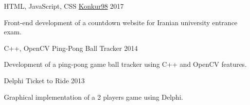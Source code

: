 \begin{cventries}
  \cventry
    {HTML, JavaScript, CSS} %
    {\href{https://konkur98.ga}{Konkur98}} %
    {} %
    {2017} %
    {
      \begin{cvitems} %
      	\item {Front-end development of a countdown website for Iranian university entrance exam.}
      \end{cvitems}
    }

  \cventry
    {C++, OpenCV} %
    {Ping-Pong Ball Tracker} %
    {} %
    {2014} %
    {
      \begin{cvitems} %
        \item {Development of a ping-pong game ball tracker using C++ and OpenCV features.}
      \end{cvitems}
    }

  \cventry
    {Delphi} %
    {Ticket to Ride} %
    {} %
    {2013} %
    {
      \begin{cvitems} %
        \item {Graphical implementation of a 2 players game using Delphi.}
      \end{cvitems}
    }

\end{cventries}
